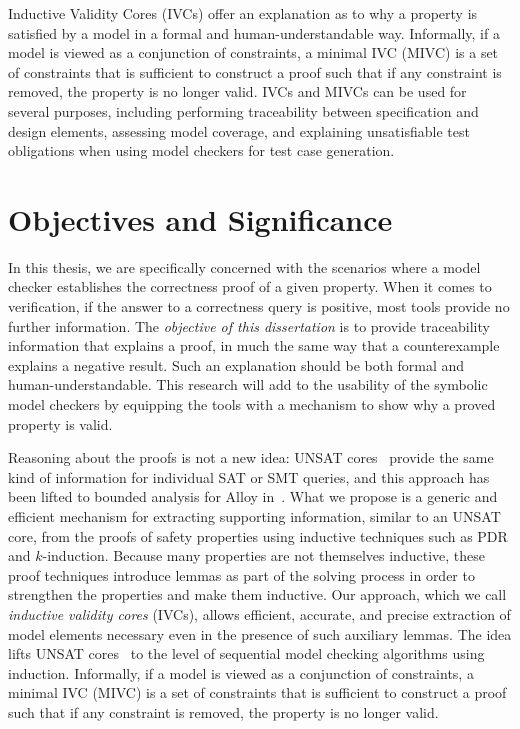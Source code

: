 Inductive Validity Cores (IVCs) offer an explanation as to why a property is satisfied by a model in a formal and human-understandable way. Informally, if a model is viewed as a conjunction of constraints,
a minimal IVC (MIVC) is a set of constraints that is sufficient to construct a proof such that if any constraint is removed, the property is no longer valid.
IVCs and MIVCs can be used for several purposes, including performing traceability between specification and design elements, assessing model coverage, and explaining unsatisfiable test obligations when using model checkers for test case generation.


\section{Objectives and Significance}
\label{sec:obj}
In this thesis, we are specifically concerned with the scenarios where a model checker establishes the correctness proof of a given property.
 When it comes to verification, if the answer to a correctness query is positive, most tools provide no further information.  The \textit{objective of this dissertation} is to provide traceability information that explains a proof, in much the same way that a counterexample explains a negative result.
Such an explanation should be both formal and human-understandable. This research will add to the usability of the symbolic model checkers by equipping the tools with a mechanism to show why a proved property is valid.

Reasoning about the proofs is not a new idea: UNSAT cores~\cite{zhang2003extracting}
provide the same kind of information for individual SAT or
SMT queries, and this approach has been lifted to bounded analysis
for Alloy in~\cite{Torlak08:cores}.
What we propose is a generic and efficient
mechanism for extracting supporting information, similar to an UNSAT
core, from the proofs of safety properties using inductive techniques
such as PDR and $k$-induction. Because many
properties are not themselves inductive, these proof techniques
introduce lemmas as part of the solving process in order to strengthen
the properties and make them inductive. Our approach, which we call {\em inductive validity cores} (IVCs), allows efficient, accurate, and precise extraction of model elements necessary even in the presence of such auxiliary lemmas. The idea lifts UNSAT cores~\cite{zhang2003extracting}
to the level of sequential model checking algorithms using induction.  Informally, if a model is viewed as a conjunction of constraints,
a minimal IVC (MIVC) is a set of constraints that is sufficient to construct a proof such that if any constraint is removed, the property is no longer valid.


